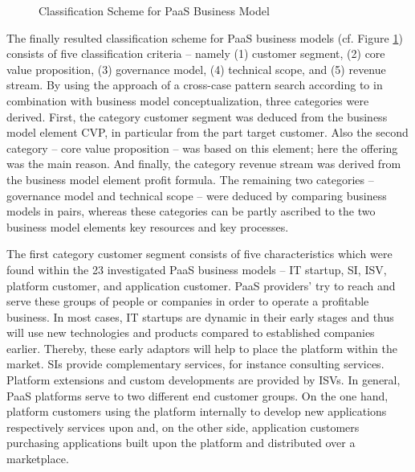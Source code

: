 \begin{figure}[htb]
	\centering
	
	\caption{Classification Scheme for PaaS Business Model}
	\label{fig:cs}
\end{figure}

The finally resulted classification scheme for \ac{PaaS} business models (cf. Figure \ref{fig:cs}) consists of five classification criteria -- namely (1) customer segment, (2) core value proposition, (3) governance model, (4) technical scope, and (5) revenue stream. By using the approach of a cross-case pattern search according to \citet{Eisenhardt1989} in combination with \citet{Johnson2008} business model conceptualization, three categories were derived. First, the category customer segment was deduced from the business model element \ac{CVP}, in particular from the part target customer. Also the second category -- core value proposition -- was based on this element; here the offering was the main reason. And finally, the category revenue stream was derived from the business model element profit formula. The remaining two categories -- governance model and technical scope -- were deduced by comparing business models in pairs, whereas these categories can be partly ascribed to the two business model elements key resources and key processes.

The first category customer segment consists of five characteristics which were found within the 23 investigated \ac{PaaS} business models --  IT startup, \ac{SI}, \ac{ISV}, platform customer, and application customer. \ac{PaaS} providers' try to reach and serve these groups of people or companies in order to operate a profitable business. In most cases, IT startups are dynamic in their early stages and thus will use new technologies and products compared to established companies earlier. Thereby, these early adaptors will help to place the platform within the market. \acp{SI} provide complementary services, for instance consulting services. Platform extensions and custom developments are provided by \acp{ISV}. In general, \ac{PaaS} platforms serve to two different end customer groups. On the one hand, platform customers using the platform internally to develop new applications respectively services upon and, on the other side, application customers purchasing applications built upon the platform and distributed over a marketplace.

